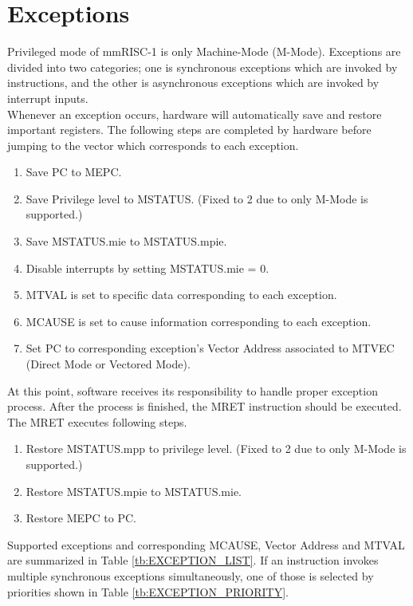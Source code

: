 \section{Exceptions}

Privileged mode of mmRISC-1 is only Machine-Mode (M-Mode). Exceptions are divided into two categories; one is synchronous exceptions which are invoked by instructions, and the other is asynchronous exceptions which are invoked by interrupt inputs.\\
Whenever an exception occurs, hardware will automatically save and restore important registers. The following steps are completed by hardware before jumping to the vector which corresponds to each exception.

\begin{enumerate}
    \item Save PC to MEPC.
    \item Save Privilege level to MSTATUS. (Fixed to 2 due to only M-Mode is supported.)
    \item Save MSTATUS.mie to MSTATUS.mpie.
    \item Disable interrupts by setting MSTATUS.mie = 0.
    \item MTVAL is set to specific data corresponding to each exception.
    \item MCAUSE is set to cause information corresponding to each exception.
    \item Set PC to corresponding exception’s Vector Address associated to MTVEC (Direct Mode or Vectored Mode).
\end{enumerate}

At this point, software receives its responsibility to handle proper exception process. After the process is finished, the MRET instruction should be executed. The MRET executes following steps.

\begin{enumerate}
    \item Restore MSTATUS.mpp to privilege level. (Fixed to 2 due to only M-Mode is supported.)
    \item Restore MSTATUS.mpie to MSTATUS.mie.
    \item Restore MEPC to PC.
\end{enumerate}

Supported exceptions and corresponding MCAUSE, Vector Address and MTVAL are summarized in Table \ref{tb:EXCEPTION_LIST}. If an instruction invokes multiple synchronous exceptions simultaneously, one of those is selected by priorities shown in Table \ref{tb:EXCEPTION_PRIORITY}.

